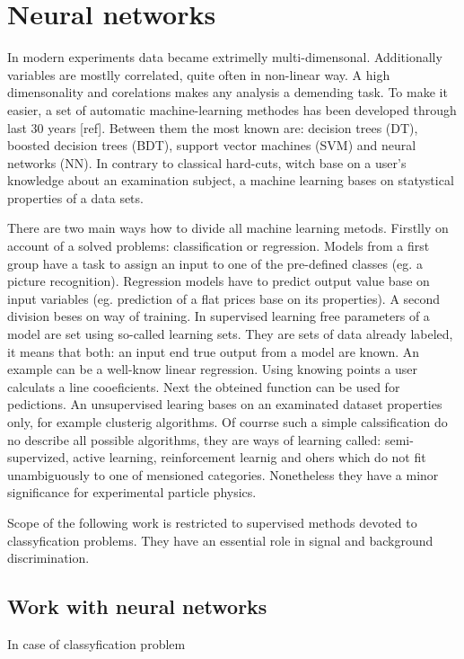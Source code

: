 \newcommand{\h}{$h(\vec{x})$}
\newcommand{\e}{\epsilon}
\chapter{Neural networks}\label{chapter:NN}
In modern experiments data became extrimelly multi-dimensonal. Additionally variables are mostlly correlated, quite often in non-linear way. A high dimensonality and corelations makes any analysis a demending task. To make it easier, a set of automatic machine-learning methodes has been developed through last 30 years [ref]. Between them the most known are: decision trees (DT), boosted decision trees (BDT), support vector machines (SVM) and neural networks (NN). In contrary to classical hard-cuts, witch base on a user's knowledge about an examination subject, a machine learning bases on statystical properties of a data sets.

There are two main ways how to divide all machine learning metods. Firstlly on account of a solved problems: classification or regression. Models from a first group have a task to assign an input to one of the pre-defined classes (eg. a picture recognition). Regression models have to predict output value base on input variables (eg. prediction of a flat prices base on its properties). A second division beses on way of training. In supervised learning free parameters of a model are set using so-called learning sets. They are sets of data already labeled, it means that both: an input end true output from a model are known. An example can be a well-know linear regression. Using knowing points a user calculats a line cooeficients. Next the obteined function can be used for pedictions. An unsupervised learing bases on an examinated dataset properties only, for example clusterig algorithms. Of courrse such a simple calssification do no describe all possible algorithms, they are ways of learning called: semi-supervized, active learning, reinforcement learnig and ohers which do not fit unambiguously to one of mensioned categories. Nonetheless they have a minor significance for experimental particle physics.

Scope of the following work is restricted to supervised methods devoted to classyfication problems. They have an essential role in signal and background discrimination. 

\section{Work with neural networks}
In case of classyfication problem 

